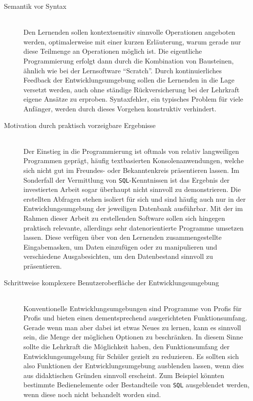 \begin{description}
\item[Semantik vor Syntax] \label{principle:semantics}\hfill\\
  Den Lernenden sollen kontextsensitiv sinnvolle Operationen angeboten werden, optimalerweise mit einer kurzen Erläuterung, warum gerade nur diese Teilmenge an Operationen möglich ist. Die eigentliche Programmierung erfolgt dann durch die Kombination von Bausteinen, ähnlich wie bei der Lernsoftware "`Scratch"'. Durch kontinuierliches Feedback der Entwicklungsumgebung sollen die Lernenden in die Lage versetzt werden, auch ohne ständige Rückversicherung bei der Lehrkraft eigene Ansätze zu erproben. Syntaxfehler, ein typisches Problem für viele Anfänger, werden durch dieses Vorgehen konstruktiv verhindert.
\item[Motivation durch praktisch vorzeigbare Ergebnisse]\hfill\\
  Der Einstieg in die Programmierung ist oftmals von relativ langweiligen Programmen geprägt, häufig textbasierten Konsolenanwendungen, welche sich nicht gut im Freundes- oder Bekanntenkreis präsentieren lassen. Im Sonderfall der Vermittlung von \texttt{SQL}-Kenntnissen ist das Ergebnis der investierten Arbeit sogar überhaupt nicht sinnvoll zu demonstrieren. Die erstellten Abfragen stehen isoliert für sich und sind häufig auch nur in der Entwicklungsumgebung der jeweiligen Datenbank ausführbar. Mit der im Rahmen dieser Arbeit zu erstellenden Software sollen sich hingegen praktisch relevante, allerdings sehr datenorientierte Programme umsetzen lassen. Diese verfügen über von den Lernenden zusammengestellte Eingabemasken, um Daten einzufügen oder zu manipulieren und verschiedene Ausgabesichten, um den Datenbestand sinnvoll zu präsentieren.
\item[Schrittweise komplexere Benutzeroberfläche der Entwicklungsumgebung] \hfill \\
  Konventionelle Entwicklungsumgebungen sind Programme von Profis für Profis und bieten einen dementsprechend ausgerichteten Funktionsumfang. Gerade wenn man aber dabei ist etwas Neues zu lernen, kann es sinnvoll sein, die Menge der möglichen Optionen zu beschränken. In diesem Sinne sollte die Lehrkraft die Möglichkeit haben, den Funktionsumfang der Entwicklungsumgebung für Schüler gezielt zu reduzieren. Es sollten sich also Funktionen der Entwicklungsumgebung ausblenden lassen, wenn dies aus didaktischen Gründen sinnvoll erscheint. Zum Beispiel könnten bestimmte Bedienelemente oder Bestandteile von \texttt{SQL} ausgeblendet werden, wenn diese noch nicht behandelt worden sind.

\end{description}
